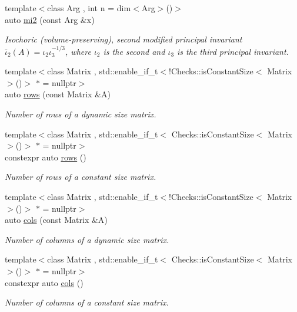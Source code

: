 \begin{DoxyCompactItemize}
{\footnotesize template$<$class Arg , int n = dim$<$\+Arg$>$()$>$ }\\auto \hyperlink{group__InvariantGroup_ga9d219c5c48cce1d3af60345916963524}{mi2} (const Arg \&x)
\begin{DoxyCompactList}\small\item\em Isochoric (volume-\/preserving), second modified principal invariant $ \bar\iota_2(A)=\iota_2\iota_3^{-1/3} $, where $\iota_2$ is the second and $\iota_3$ is the third principal invariant. \end{DoxyCompactList}\item 
{\footnotesize template$<$class Matrix , std\+::enable\+\_\+if\+\_\+t$<$!\+Checks\+::is\+Constant\+Size$<$ Matrix $>$()$>$ $\ast$  = nullptr$>$ }\\auto \hyperlink{namespaceFunG_1_1LinearAlgebra_abd3afa2fcd2194787342b2662cfa9f5a}{rows} (const Matrix \&A)
\begin{DoxyCompactList}\small\item\em Number of rows of a dynamic size matrix. \end{DoxyCompactList}\item 
{\footnotesize template$<$class Matrix , std\+::enable\+\_\+if\+\_\+t$<$ Checks\+::is\+Constant\+Size$<$ Matrix $>$()$>$ $\ast$  = nullptr$>$ }\\constexpr auto \hyperlink{namespaceFunG_1_1LinearAlgebra_ab401cccb1259e724bf37d2e198e2ca3d}{rows} ()
\begin{DoxyCompactList}\small\item\em Number of rows of a constant size matrix. \end{DoxyCompactList}\item 
{\footnotesize template$<$class Matrix , std\+::enable\+\_\+if\+\_\+t$<$!\+Checks\+::is\+Constant\+Size$<$ Matrix $>$()$>$ $\ast$  = nullptr$>$ }\\auto \hyperlink{namespaceFunG_1_1LinearAlgebra_ae981b8bee32eea3ce87f41874835c9c1}{cols} (const Matrix \&A)
\begin{DoxyCompactList}\small\item\em Number of columns of a dynamic size matrix. \end{DoxyCompactList}\item 
{\footnotesize template$<$class Matrix , std\+::enable\+\_\+if\+\_\+t$<$ Checks\+::is\+Constant\+Size$<$ Matrix $>$()$>$ $\ast$  = nullptr$>$ }\\constexpr auto \hyperlink{namespaceFunG_1_1LinearAlgebra_a9eb685419fe4c5f91619d5aa0f973320}{cols} ()
\begin{DoxyCompactList}\small\item\em Number of columns of a constant size matrix. \end{DoxyCompactList}\item 

\end{DoxyCompactItemize}
